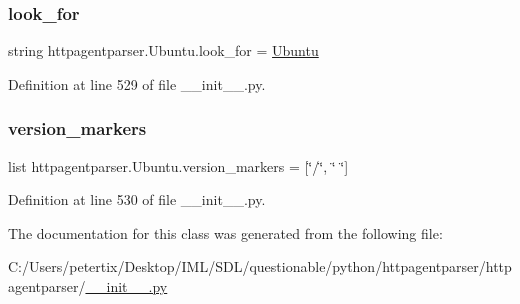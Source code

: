 \subsubsection{\texorpdfstring{look\+\_\+for}{look\_for}}
{\footnotesize\ttfamily string httpagentparser.\+Ubuntu.\+look\+\_\+for = \textquotesingle{}\hyperlink{classhttpagentparser_1_1_ubuntu}{Ubuntu}\textquotesingle{}\hspace{0.3cm}{\ttfamily [static]}}



Definition at line 529 of file \+\_\+\+\_\+init\+\_\+\+\_\+.\+py.

\hypertarget{classhttpagentparser_1_1_ubuntu_a9a70602ae3c550ef356cc1df6403afe4}{}\label{classhttpagentparser_1_1_ubuntu_a9a70602ae3c550ef356cc1df6403afe4} 
\subsubsection{\texorpdfstring{version\+\_\+markers}{version\_markers}}
{\footnotesize\ttfamily list httpagentparser.\+Ubuntu.\+version\+\_\+markers = \mbox{[}\char`\"{}/\char`\"{}, \char`\"{} \char`\"{}\mbox{]}\hspace{0.3cm}{\ttfamily [static]}}



Definition at line 530 of file \+\_\+\+\_\+init\+\_\+\+\_\+.\+py.



The documentation for this class was generated from the following file\+:\begin{DoxyCompactItemize}
\item 
C\+:/\+Users/petertix/\+Desktop/\+I\+M\+L/\+S\+D\+L/questionable/python/httpagentparser/httpagentparser/\hyperlink{____init_____8py}{\+\_\+\+\_\+init\+\_\+\+\_\+.\+py}\end{DoxyCompactItemize}
